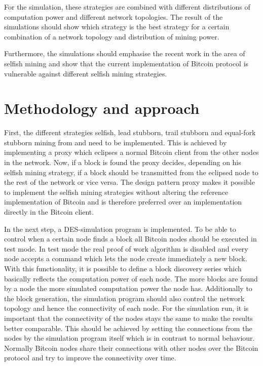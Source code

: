 \documentclass{scrartcl}
\begin{document}
For the simulation, these strategies are combined with different distributions of computation power and different network topologies. The result of the simulations should show which strategy is the best strategy for a certain combination of a network topology and distribution of mining power. 

Furthermore, the simulations should emphasise the recent work in the area of selfish mining and show that the current implementation of Bitcoin protocol is vulnerable against different selfish mining strategies.

\section{Methodology and approach}
First, the different strategies selfish, lead stubborn, trail stubborn and equal-fork stubborn mining from \citeauthor{nayak2016stubborn} and \citeauthor{eyal2014majority} need to be implemented. This is achieved by implementing a proxy which eclipses a normal Bitcoin client from the other nodes in the network. Now, if a block is found the proxy decides, depending on his selfish mining strategy, if a block should be transmitted from the eclipsed node to the rest of the network or vice versa. The design pattern proxy makes it possible to implement the selfish mining strategies without altering the reference implementation of Bitcoin and is therefore preferred over an implementation directly in the Bitcoin client.

In the next step, a DES-simulation program is implemented. To be able to control when a certain node finds a block all Bitcoin nodes should be executed in test mode. In test mode the real proof of work algorithm is disabled and every node accepts a command which lets the node create immediately a new block. With this functionality, it is possible to define a block discovery series which basically reflects the computation power of each node. The more blocks are found by a node the more simulated computation power the node has. Additionally to the block generation, the simulation program should also control the network topology and hence the connectivity of each node. For the simulation run, it is important that the connectivity of the nodes stays the same to make the results better comparable. This should be achieved by setting the connections from the nodes by the simulation program itself which is in contrast to normal behaviour. Normally Bitcoin nodes share their connections with other nodes over the Bitcoin protocol and try to improve the connectivity over time.
\end{document}
